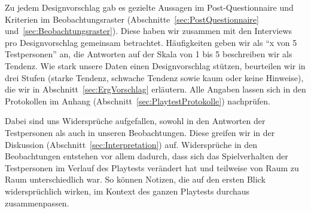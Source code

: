 \documentclass[../Main.tex]{subfiles}
\begin{document}
Zu jedem Designvorschlag gab es gezielte Aussagen im Post-Questionnaire und Kriterien im Beobachtungsraster (Abschnitte~\ref{sec:PostQuestionnaire} und~\ref{sec:Beobachtungsraster}). Diese haben wir zusammen mit den Interviews pro Designvorschlag gemeinsam betrachtet. Häufigkeiten geben wir als \enquote{x von 5 Testpersonen} an, die Antworten auf der Skala von 1 bis 5 beschreiben wir als Tendenz. Wie stark unsere Daten einen Designvorschlag stützen, beurteilen wir in drei Stufen (starke Tendenz, schwache Tendenz sowie kaum oder keine Hinweise), die wir in Abschnitt~\ref{sec:ErgVorschlag} erläutern. Alle Angaben lassen sich in den Protokollen im Anhang (Abschnitt~\ref{sec:PlaytestProtokolle}) nachprüfen.

Dabei sind uns Widersprüche aufgefallen, sowohl in den Antworten der Testpersonen als auch in unseren Beobachtungen. Diese greifen wir in der Diskussion (Abschnitt~\ref{sec:Interpretation}) auf. Widersprüche in den Beobachtungen entstehen vor allem dadurch, dass sich das Spielverhalten der Testpersonen im Verlauf des Playtests verändert hat und teilweise von Raum zu Raum unterschiedlich war. So können Notizen, die auf den ersten Blick widersprüchlich wirken, im Kontext des ganzen Playtests durchaus zusammenpassen.
\end{document}
